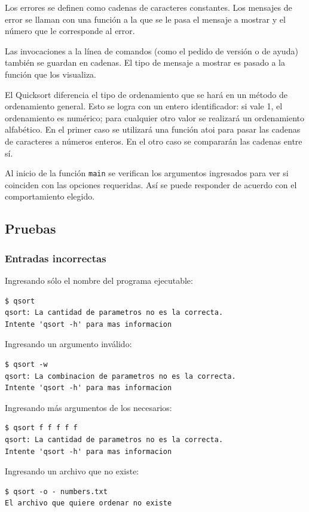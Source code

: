\documentclass[a4paper, 12pt]{article}
\begin{document}
		Los errores se definen como cadenas de caracteres constantes. Los mensajes de error se llaman con una función a la que se le pasa el mensaje a mostrar y el número que le corresponde al error.
		
		Las invocaciones a la línea de comandos (como el pedido de versión o de ayuda) también se guardan en cadenas. El tipo de mensaje a mostrar es pasado a la función que los visualiza.
		
		El Quicksort diferencia el tipo de ordenamiento que se hará en un método de ordenamiento general. Esto se logra con un entero identificador: si vale 1, el ordenamiento es numérico; para cualquier otro valor se realizará un ordenamiento alfabético. En el primer caso se utilizará una función atoi para pasar las cadenas de caracteres a números enteros. En el otro caso se compararán las cadenas entre sí.
		
		Al inicio de la función \texttt{main} se verifican los argumentos ingresados para ver si coinciden con las opciones requeridas.	Así se puede responder de acuerdo con el comportamiento elegido. 
		
	\subsection{Pruebas}
	
	\subsubsection{Entradas incorrectas}
	Ingresando sólo el nombre del programa ejecutable:
	\begin{verbatim}
$ qsort
qsort: La cantidad de parametros no es la correcta.
Intente 'qsort -h' para mas informacion
	\end{verbatim}
	
	Ingresando un argumento inválido:
	\begin{verbatim}
$ qsort -w
qsort: La combinacion de parametros no es la correcta.
Intente 'qsort -h' para mas informacion
	\end{verbatim}
	
	Ingresando más argumentos de los necesarios:
	\begin{verbatim}
$ qsort f f f f f
qsort: La cantidad de parametros no es la correcta.
Intente 'qsort -h' para mas informacion
	\end{verbatim}
	
	Ingresando un archivo que no existe:
	\begin{verbatim}
$ qsort -o - numbers.txt
El archivo que quiere ordenar no existe
	\end{verbatim}
	
\end{document}
